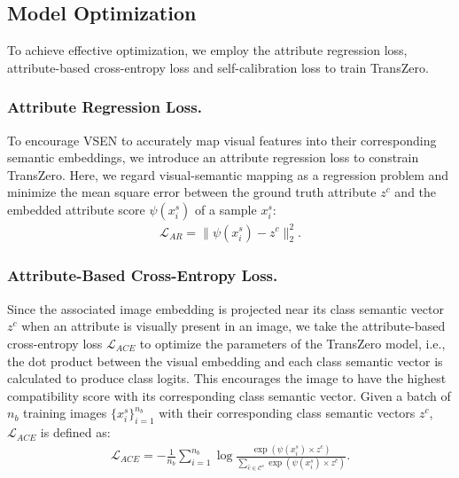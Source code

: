 \documentclass[letterpaper]{article} %
\begin{document}
	
	
	
	\subsection{Model Optimization}\label{sec3.4}
	To achieve effective optimization, we employ the attribute regression loss, attribute-based cross-entropy loss and self-calibration loss to train TransZero. 
	
	\subsubsection{Attribute Regression Loss.}
	To encourage VSEN to accurately map visual features into their corresponding semantic embeddings, we introduce an attribute regression loss to constrain TransZero. Here, we regard visual-semantic mapping as a regression problem and minimize the mean square error between the ground truth attribute $z^{c}$ and the embedded attribute score $\psi(x_i^s)$ of a sample $x_i^s$:
	\begin{gather}
	\label{eq:reg-loss}
	\mathcal{L}_{AR}=\|\psi(x_i^s)-z^{c}\|_{2}^{2}.
	\end{gather}
	
	\subsubsection{Attribute-Based Cross-Entropy Loss.}
	Since the associated image embedding is projected near its class semantic vector $z^{c}$ when an attribute is visually present in an image, we take the attribute-based cross-entropy loss $\mathcal{L}_{ACE}$ to optimize the parameters of the TransZero model, i.e., the dot product between the visual embedding and each class semantic vector is calculated to produce class logits. This encourages the image to have the highest compatibility score with its corresponding class semantic vector. Given a batch of $n_b$ training images $\{x_i^s\}_{i=1}^{n_b}$ with their corresponding class semantic vectors $z^c$,  $\mathcal{L}_{ACE}$ is defined as:
	\begin{gather}
	\label{eq:L_ACE}
	\mathcal{L}_{ACE}=-\frac{1}{n_{b}} \sum_{i=1}^{n_{b}} \log \frac{\exp \left(\psi(x_i^s) \times z^{c}\right)}{\sum_{\hat{c} \in \mathcal{C}^s} \exp \left(\psi(x_i^s) \times z^{\hat{c}} \right)}.
	\end{gather}
	
\end{document}
